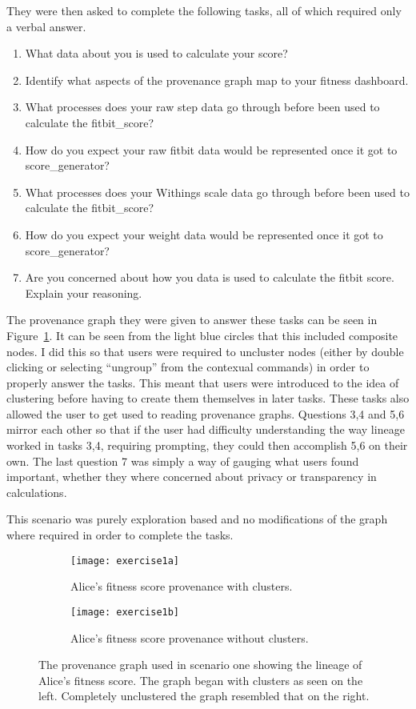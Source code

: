 They were then asked to complete the following tasks, all of which required only a verbal answer.
\begin{enumerate}[label=\arabic*.]
	\item What data about you is used to calculate your score?
	\item Identify what aspects of the provenance graph map to your fitness dashboard.
	\item What processes does your raw step data go through before been used to calculate the fitbit\_score?
	\item How do you expect your raw fitbit data would be represented once it got to score\_generator?
	\item What processes does your Withings scale data go through before been used to calculate the fitbit\_score?
	\item How do you expect your weight data would be represented once it got to score\_generator?
	\item Are you concerned about how you data is used to calculate the fitbit score. Explain your reasoning. 
\end{enumerate}

The provenance graph they were given to answer these tasks can be seen in Figure~\ref{fig:exercise1a}. It can be seen from the light blue circles that this included composite nodes. I did this so that users were required to uncluster nodes (either by double clicking or selecting ``ungroup'' from the contexual commands) in order to properly answer the tasks. This meant that users were introduced to the idea of clustering before having to create them themselves in later tasks. These tasks also allowed the user to get used to reading provenance graphs. Questions 3,4 and 5,6 mirror each other so that if the user had difficulty understanding the way lineage worked in tasks 3,4, requiring prompting, they could then accomplish 5,6 on their own. The last question 7 was simply a way of gauging what users found important, whether they where concerned about privacy or transparency in calculations.

This scenario was purely exploration based and no modifications of the graph where required in order to complete the tasks.

\begin{figure}[h]
	\begin{subfigure}[t]{0.4\textwidth}
	\centering
	\texttt{[image: exercise1a]}
	\caption{Alice's fitness score provenance with clusters.}
	\label{fig:exercise1a}
	\end{subfigure}
	\begin{subfigure}[t]{0.4\textwidth}
	\centering
	\texttt{[image: exercise1b]}
	\caption{Alice's fitness score provenance without clusters.}
	\end{subfigure}
	\caption{The provenance graph used in scenario one showing the lineage of Alice's fitness score. The graph began with clusters as seen on the left. Completely unclustered the graph resembled that on the right.}
\end{figure}

